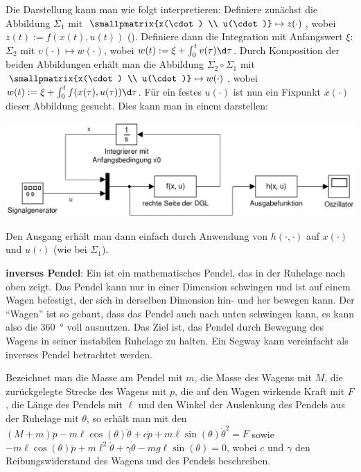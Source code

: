 Die Darstellung kann man wie folgt interpretieren:
Definiere zunächst die Abbildung $\Sigma_1$ mit
$\smallpmatrix{x(\cdot) \\ u(\cdot)} \mapsto z(\cdot)$,
wobei $z(t) := f(x(t), u(t))$ ().
Definiere dann die Integration mit Anfangswert $\xi$:
$\Sigma_2$ mit $v(\cdot) \mapsto w(\cdot)$, wobei $w(t) := \xi + \int_0^t v(\tau)\d\tau$.
Durch Komposition der beiden Abbildungen erhält man die Abbildung $\Sigma_2 \circ \Sigma_1$ mit
$\smallpmatrix{x(\cdot) \\ u(\cdot)} \mapsto w(\cdot)$, wobei
$w(t) := \xi + \int_0^t f(x(\tau), u(\tau))\d\tau$.
Für ein festes $u(\cdot)$ ist nun ein Fixpunkt $x(\cdot)$ dieser Abbildung gesucht.
Dies kann man in einem  darstellen:
\begin{center}
    \includegraphics[scale=\modelscale]{dgl}
\end{center}
Den Ausgang erhält man dann einfach durch Anwendung von $h(\cdot, \cdot)$ auf
$x(\cdot)$ und $u(\cdot)$ (wie bei $\Sigma_1$).

\linie

\textbf{inverses Pendel}:
Ein  ist ein mathematisches Pendel,
das in der Ruhelage nach oben zeigt.
Das Pendel kann nur in einer Dimension schwingen und ist auf einem Wagen befestigt,
der sich in derselben Dimension hin- und her bewegen kann.
Der "`Wagen"' ist so gebaut, dass das Pendel auch nach unten schwingen kann,
es kann also die \SI{360}{\degree} voll ausnutzen.
Das Ziel ist, das Pendel durch Bewegung des Wagens in seiner instabilen Ruhelage zu halten.
Ein Segway kann vereinfacht als inverses Pendel betrachtet werden.

Bezeichnet man
die Masse am Pendel mit $m$,
die Masse des Wagens mit $M$,
die zurückgelegte Strecke des Wagens mit $p$,
die auf den Wagen wirkende Kraft mit $F$,
die Länge des Pendels mit $\ell$ und
den Winkel der Auslenkung des Pendels aus der Ruhelage mit $\theta$,
so erhält man mit den 
$(M + m)\ddot{p} - m\ell \cos(\theta)\ddot{\theta} + c\dot{p} +
m\ell \sin(\theta)\dot{\theta}^2 = F$ sowie\\
$-m\ell \cos(\theta)\ddot{p} + m\ell^2\ddot{\theta} + \gamma \dot{\theta} -
mg\ell \sin(\theta) = 0$,
wobei $c$ und $\gamma$ den Reibungswiderstand des Wagens und des Pendels beschreiben.


